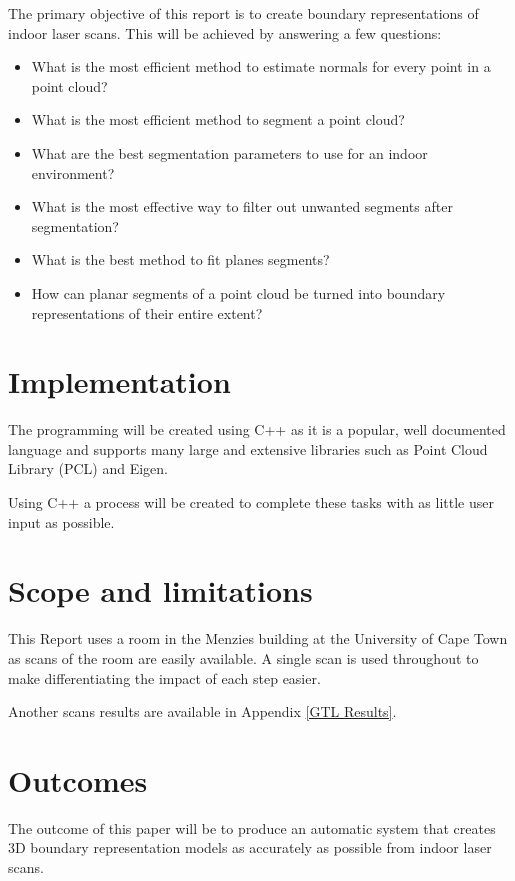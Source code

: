 		The primary objective of this report is to create boundary representations of indoor laser scans. This will be achieved by answering a few questions:
		
		\begin{itemize}
			\item What is the most efficient method to estimate normals for every point in a point cloud?
			
			\item What is the most efficient method to segment a point cloud?
			
			\item What are the best segmentation parameters to use for an indoor environment?
			
			\item What is the most effective way to filter out unwanted segments after segmentation?
			
			\item What is the best method to fit planes segments?
			
			\item How can planar segments of a point cloud be turned into boundary representations of their entire extent?
			
		\end{itemize}
	
	\section{Implementation}
	
		The programming will be created using C++ as it is a popular, well documented language and supports many large and extensive libraries such as Point Cloud Library (PCL) and Eigen. 
		
		Using C++ a process will be created to complete these tasks with as little user input as possible.
	
	\section{Scope and limitations}
		This Report uses a room in the Menzies building at the University of Cape Town as scans of the room are easily available. A single scan is used throughout to make differentiating the impact of each step easier.
		
		Another scans results are available in Appendix \ref{GTL Results}.
		
	\section{Outcomes}
	
		The outcome of this paper will be to produce an automatic system that creates 3D boundary representation models as accurately as possible from indoor laser scans.
	
	
	
	



